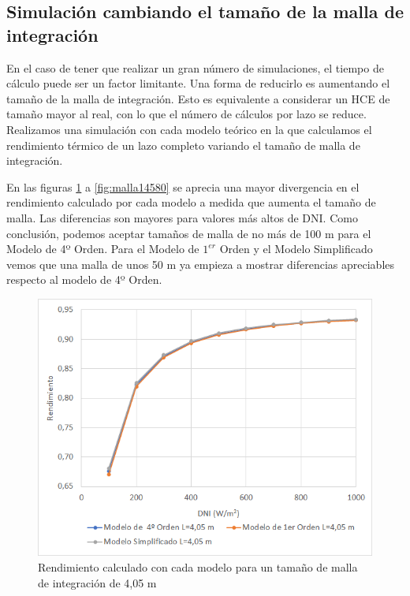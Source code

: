 \subsection{Simulación cambiando el tamaño de la malla de integración}
\label{mallaintegracion}

En el caso de tener que realizar un gran número de simulaciones, el tiempo de cálculo puede ser un factor limitante. Una forma de reducirlo es aumentando el tamaño de la malla de integración. Esto es equivalente a considerar un HCE de tamaño mayor al real, con lo que el número de cálculos por lazo se reduce. Realizamos una simulación con cada modelo teórico en la que calculamos el rendimiento térmico de un lazo completo variando el tamaño de malla de integración.  

En las figuras  \ref{fig:malla0405} a \ref{fig:malla14580} se aprecia una mayor divergencia en el rendimiento calculado por cada modelo a medida que aumenta el tamaño de malla. Las diferencias son mayores para valores más altos de DNI. Como conclusión, podemos aceptar tamaños de malla de no más de 100 m para el Modelo de 4º Orden. Para el Modelo de $1^{er}$ Orden y el Modelo Simplificado vemos que una malla de unos 50 m ya empieza a mostrar diferencias apreciables respecto al modelo de 4º Orden.

\begin{figure}[H]
\includegraphics[width=0.9\linewidth]{images/malla0405.png}
\caption{Rendimiento calculado con cada modelo para un tamaño de malla de integración de 4,05 m} 
\label{fig:malla0405}
\end{figure}

